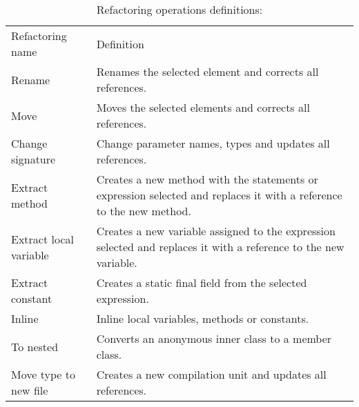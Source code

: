 \begin{table}[htbp]
\caption{Refactoring operations definitions:}
\label{tab-Refactoring-Definitions}
\begin{tabular}{ p{2.95cm}| p{9.15cm}}
\hline\noalign{\smallskip}
Refactoring name 		  & Definition \\
\noalign{\smallskip}
\hline
\noalign{\smallskip}
Rename                    & Renames the selected element and corrects all references.                                                                                                                 \\ \hline
Move                      & Moves the selected elements and corrects all references.                                                                                                                  \\ \hline
Change signature          & Change parameter names, types and updates all references.                                                                                                                 \\ \hline
Extract method            & Creates a new method with the statements or expression selected and replaces it with a reference to the new method.                                                          \\ \hline
Extract local variable    & Creates a new variable assigned to the expression selected and replaces it with a reference to the new variable.                                                             \\ \hline
Extract constant          & Creates a static final field from the selected expression.                                                                                                                \\ \hline
Inline                    & Inline local variables, methods or constants.                                                                                                                             \\ \hline
To nested                 & Converts an anonymous inner class to a member class.                                                                                                                      \\ \hline
Move type to new file     & Creates a new compilation unit and updates all references.                                                                                                                \\ \hline

\end{tabular}
\end{table}
